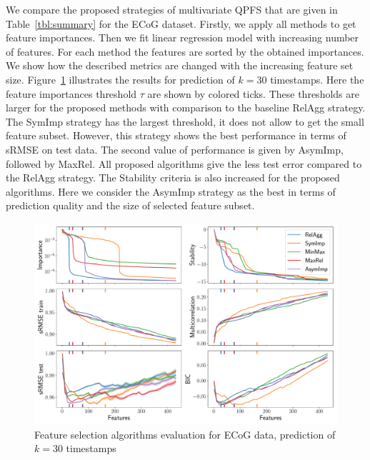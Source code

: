\documentclass[12pt,oneside]{article}
\theoremstyle{definition}
\begin{document}
We compare the proposed strategies of multivariate QPFS that are given in Table~\ref{tbl:summary} for the ECoG dataset. 
Firstly, we apply all methods to get feature importances. 
Then we fit linear regression model with increasing number of features. 
For each method the features are sorted by the obtained importances. 
We show how the described metrics are changed with the increasing feature set size. 
Figure~\ref{fig:ecog_3_30_metrics} illustrates the results for prediction of $k = 30$ timestamps. 
Here the feature importances threshold $\tau$ are shown by colored ticks. 
These thresholds are larger for the proposed methods with comparison to the baseline RelAgg strategy. 
The SymImp strategy has the largest threshold, it does not allow to get the small feature subset.
However, this strategy shows the best performance in terms of sRMSE on test data.
The second value of performance is given by AsymImp, followed by MaxRel.
All proposed algorithms give the less test error compared to the RelAgg strategy. 
The Stability criteria is also increased for the proposed algorithms.
Here we consider the AsymImp strategy as the best in terms of prediction quality and the size of selected feature subset.

\begin{figure}[h]
	\includegraphics[width=\linewidth]{figs/ecog_3_30_metrics.pdf}
	\caption{Feature selection algorithms evaluation for ECoG data, prediction of $k = 30$ timestamps}
	\label{fig:ecog_3_30_metrics}
\end{figure}
\end{document}
